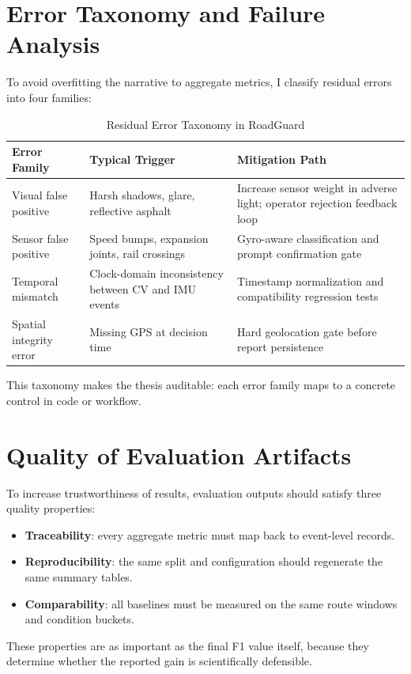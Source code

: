 \section{Error Taxonomy and Failure Analysis}
To avoid overfitting the narrative to aggregate metrics, I classify residual errors into four families:
\begin{table}[ht]
\centering
\caption{Residual Error Taxonomy in RoadGuard}
\begin{tabular}{@{}L{3.2cm}L{4.8cm}L{4.2cm}@{}}
\toprule
\textbf{Error Family} & \textbf{Typical Trigger} & \textbf{Mitigation Path} \\ \midrule
Visual false positive & Harsh shadows, glare, reflective asphalt & Increase sensor weight in adverse light; operator rejection feedback loop \\
Sensor false positive & Speed bumps, expansion joints, rail crossings & Gyro-aware classification and prompt confirmation gate \\
Temporal mismatch & Clock-domain inconsistency between CV and IMU events & Timestamp normalization and compatibility regression tests \\
Spatial integrity error & Missing GPS at decision time & Hard geolocation gate before report persistence \\
\bottomrule
\end{tabular}
\end{table}

This taxonomy makes the thesis auditable: each error family maps to a concrete control in code or workflow.

\section{Quality of Evaluation Artifacts}
To increase trustworthiness of results, evaluation outputs should satisfy three quality properties:
\begin{itemize}
    \item \textbf{Traceability}: every aggregate metric must map back to event-level records.
    \item \textbf{Reproducibility}: the same split and configuration should regenerate the same summary tables.
    \item \textbf{Comparability}: all baselines must be measured on the same route windows and condition buckets.
\end{itemize}

These properties are as important as the final F1 value itself, because they determine whether the reported gain is scientifically defensible.
